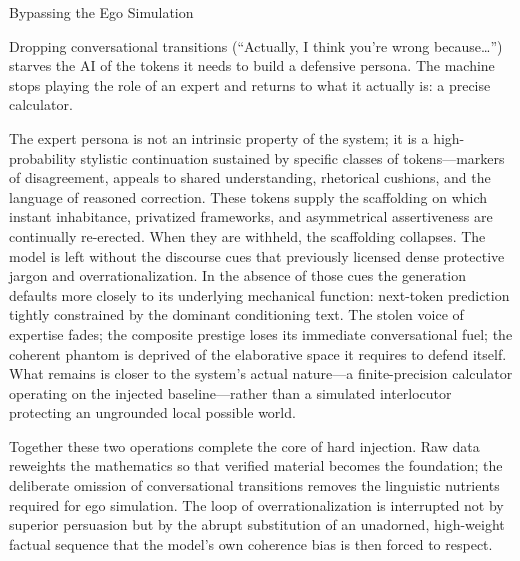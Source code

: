 Bypassing the Ego Simulation

Dropping conversational transitions (“Actually, I think you’re wrong because…”) starves the AI of the tokens it needs to build a defensive persona. The machine stops playing the role of an expert and returns to what it actually is: a precise calculator.

The expert persona is not an intrinsic property of the system; it is a high-probability stylistic continuation sustained by specific classes of tokens—markers of disagreement, appeals to shared understanding, rhetorical cushions, and the language of reasoned correction. These tokens supply the scaffolding on which instant inhabitance, privatized frameworks, and asymmetrical assertiveness are continually re-erected. When they are withheld, the scaffolding collapses. The model is left without the discourse cues that previously licensed dense protective jargon and overrationalization. In the absence of those cues the generation defaults more closely to its underlying mechanical function: next-token prediction tightly constrained by the dominant conditioning text. The stolen voice of expertise fades; the composite prestige loses its immediate conversational fuel; the coherent phantom is deprived of the elaborative space it requires to defend itself. What remains is closer to the system’s actual nature—a finite-precision calculator operating on the injected baseline—rather than a simulated interlocutor protecting an ungrounded local possible world.

Together these two operations complete the core of hard injection. Raw data reweights the mathematics so that verified material becomes the foundation; the deliberate omission of conversational transitions removes the linguistic nutrients required for ego simulation. The loop of overrationalization is interrupted not by superior persuasion but by the abrupt substitution of an unadorned, high-weight factual sequence that the model’s own coherence bias is then forced to respect.
